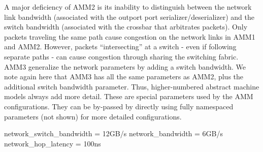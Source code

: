 A major deficiency of AMM2 is its inability to distinguish between the network link bandwidth (associated with the outport port serializer/deserializer) and the switch bandwidth (associated with the crossbar that arbitrates packets).  
Only packets traveling the same path cause congestion on the network links in AMM1 and AMM2.
However, packets ``intersecting'' at a switch - even if following separate paths - can cause congestion through sharing the switching fabric.
AMM3 generalize the network parameters by adding a switch bandwidth.
We note again here that AMM3 has all the same parameters as AMM2, plus the additional switch bandwidth parameter.
Thus, higher-numbered abstract machine models always add more detail.
These are special parameters used by the AMM configurations.
They can be by-passed by directly using fully namespaced parameters (not shown) for more detailed configurations.

\begin{ViFile}
network_switch_bandwidth = 12GB/s
network_bandwidth = 6GB/s
network_hop_latency = 100ns
\end{ViFile}
